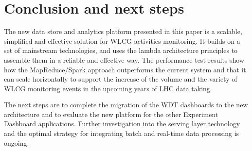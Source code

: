 \section{Conclusion and next steps}

The new data store and analytics platform presented in this paper is a
scalable, simplified and effective solution for WLCG activities monitoring. It
builds on a set of mainstream technologies, and uses the lambda architecture
principles to assemble them in a reliable and effective way. The performance
test results show how the MapReduce/Spark approach outperforms the current
system and that it can scale horizontally to support the increase of the
volume and the variety of WLCG monitoring events in the upcoming years of LHC data
taking.

The next steps are to complete the migration of the WDT dashboards to the new
architecture and to evaluate the new platform for the other Experiment
Dashboard applications. Further investigation into the serving layer technology
and the optimal strategy for integrating batch and real-time data processing is
ongoing. 




